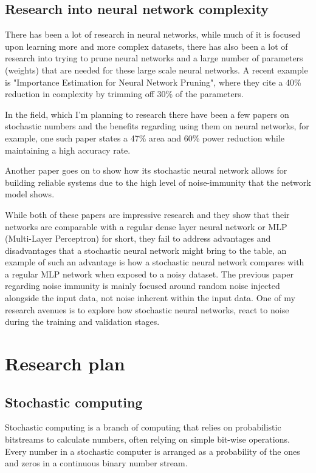 \documentclass[a4paper,oneside,phd,etd]{BYUPhys}
\begin{document}
\section{Research into neural network complexity}
There has been a lot of research in neural networks, while much of it is focused upon learning more and more complex datasets\cite{research-1}\cite{research-2}\cite{research-3}, there has also been a lot of research into trying to prune neural networks and a large number of parameters (weights) that are needed for these large scale neural networks. A recent example is "Importance Estimation for Neural Network Pruning"\cite{molchanov2019taylor}, where they cite a 40\% reduction in complexity by trimming off 30\% of the parameters.

In the field, which I'm planning to research there have been a few papers on stochastic numbers and the benefits regarding using them on neural networks, for example, one such paper states a 47\% area and 60\% power reduction while maintaining a high accuracy rate\cite{8119196}. 

Another paper\cite{7093194} goes on to show how its stochastic neural network allows for building reliable systems due to the high level of noise-immunity that the network model shows.

While both of these papers are impressive research and they show that their networks are comparable with a regular dense layer neural network or MLP (Multi-Layer Perceptron) for short, they fail to address advantages and disadvantages that a stochastic neural network might bring to the table, an example of such an advantage is how a stochastic neural network compares with a regular MLP network when exposed to a noisy dataset. The previous paper regarding noise immunity is mainly focused around random noise injected alongside the input data, not noise inherent within the input data. One of my research avenues is to explore how stochastic neural networks, react to noise during the training and validation stages.

\chapter{Research plan}
\section{Stochastic computing}

Stochastic computing is a branch of computing that relies on probabilistic bitstreams to calculate numbers, often relying on simple bit-wise operations. Every number in a stochastic computer is arranged as a probability of the ones and zeros in a continuous binary number stream\cite{stochastic-numbers}.
\end{document}
